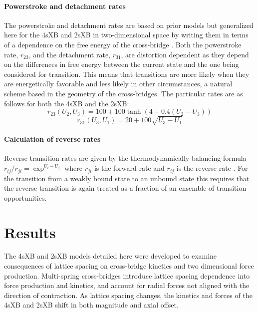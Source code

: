 \documentclass[]{article}
\begin{document}
\paragraph{Powerstroke and detachment rates} %
The powerstroke and detachment rates are based on prior models but  generalized here for the 4sXB and 2sXB in two-dimensional space by writing them in terms of a dependence on the free energy of the cross-bridge  \citep{Pate1989, Tanner2007}. 
Both the powerstroke rate, $r_{23}$, and the detachment rate, $r_{31}$, are distortion dependent as they depend on the differences in free energy between the current state and the one being considered for transition. 
This means that transitions are more likely when they are energetically favorable and less likely in other circumstances, a natural scheme based in the geometry of the cross-bridges.
The particular rates are as follows for both the 4sXB and the 2sXB: 
$$r_{23}(U_2, U_3) = 100 + 100\tanh(4 + 0.4 (U_2 - U_3)) $$
$$r_{31}(U_3, U_1) = 20 + 100 \sqrt{U_3 - U_1} $$

\paragraph{Calculation of reverse rates} %
Reverse transition rates are given by the thermodynamically balancing formula $r_{ij}/r_{ji}=\exp^{U_i-U_j}$ where $r_{ji}$ is the forward rate and $r_{ij}$ is the reverse rate \citep{Pate1989, Daniel1998, Tanner2007}.
For the transition from a weakly bound state to an unbound state this requires that the reverse transition is again treated as a fraction of an ensemble of transition opportunities. 



\section*{Results} %

The 4sXB and 2sXB models detailed here were developed to examine consequences of lattice spacing on cross-bridge kinetics and two dimensional force production.
Multi-spring cross-bridges introduce lattice spacing dependence into force production and kinetics, and account for radial forces not aligned with the direction of contraction. 
As lattice spacing changes, the kinetics and forces of the 4sXB and 2sXB shift in both magnitude and axial offset.
\end{document}
